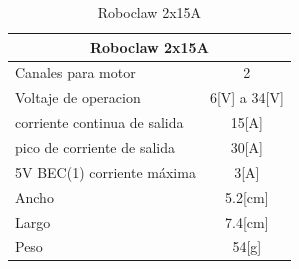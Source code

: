\documentclass[a4paper,usenames,dvipsnames,svgnames,table]{book}
\begin{document}
\begin{table}[H]
\begin{center}
\begin{tabular}{|l|l|}%


\hline
\multicolumn{2}{|c|}{Roboclaw 2x15A} \\ \hline %
Canales para motor & \multicolumn{1}{|c|}{2}\\ \hline
Voltaje de operacion & \multicolumn{1}{|c|}{6[V] a 34[V]}\\ \hline
corriente continua de salida & \multicolumn{1}{|c|}{15[A]}\\ \hline
pico de corriente de salida & \multicolumn{1}{|c|}{30[A]}\\ \hline
5V BEC(1) corriente máxima & \multicolumn{1}{|c|}{3[A]}\\ \hline
Ancho & \multicolumn{1}{|c|}{5.2[cm]}\\ \hline
Largo & \multicolumn{1}{|c|}{7.4[cm]}\\ \hline
Peso & \multicolumn{1}{|c|}{54[g]}\\ \hline

\end{tabular}
\caption{Roboclaw 2x15A}
\label{Datos del Roboclaw}
\end{center}
\end{table}
\end{document}
